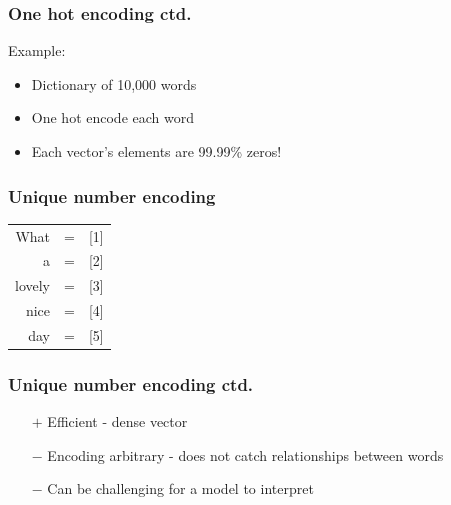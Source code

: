 
\begin{frame}
\frametitle{One hot encoding ctd.}

	Example:
	\begin{itemize}
		\item Dictionary of 10,000 words
		\item One hot encode each word
		\item Each vector's elements are 99.99\% zeros!
		
	\end{itemize}

\end{frame}



\begin{frame}
\frametitle{Unique number encoding}

\begin{table}[h]
	\hspace{15mm}
	\huge
	\begin{tabular}{rcl}
		What & = & [1] \\
		a & = & [2]\\
		lovely & = & [3]\\
		nice & = & [4]\\
		day & = & [5]\\
	\end{tabular}
\end{table}


\end{frame}



\begin{frame}
\frametitle{Unique number encoding ctd.}

	\begin{itemize}
		\item[$+$] Efficient - dense vector
		\item[$-$] Encoding arbitrary - does not catch relationships between words
		\item[$-$] Can be challenging for a model to interpret
	\end{itemize}

\end{frame}

